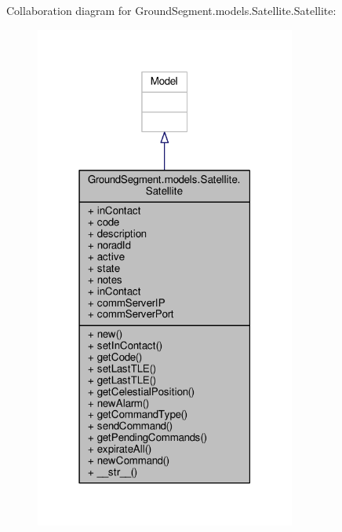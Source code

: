 Collaboration diagram for Ground\+Segment.\+models.\+Satellite.\+Satellite\+:\nopagebreak
\begin{figure}[H]
\begin{center}
\leavevmode
\includegraphics[width=243pt]{class_ground_segment_1_1models_1_1_satellite_1_1_satellite__coll__graph}
\end{center}
\end{figure}
